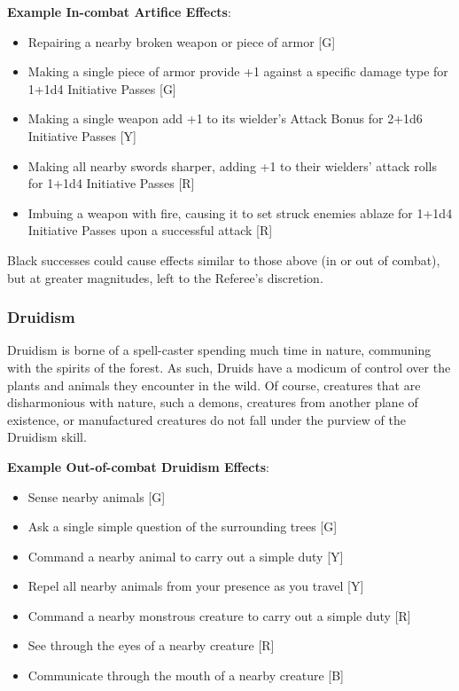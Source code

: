 \documentclass[oneside]{book}
\begin{document}
\begin{multicols}{2}
\textbf{Example In-combat Artifice Effects}: 
	\begin{itemize}
		\setlength{\itemsep}{0cm}%
  		\setlength{\parskip}{0cm}%
  		\item{ \small Repairing a nearby broken weapon or piece of armor [G]}
  		\item{ \small Making a single piece of armor provide +1 against a specific damage type for 1+1d4 Initiative Passes [G]}
  		\item{ \small Making a single weapon add +1 to its wielder's Attack Bonus for 2+1d6 Initiative Passes [Y]}
  		\item{ \small Making all nearby swords sharper, adding +1 to their wielders' attack rolls for 1+1d4 Initiative Passes [R]}
  		\item{ \small Imbuing a weapon with fire, causing it to set struck enemies ablaze for 1+1d4 Initiative Passes upon a successful attack [R]}
	\end{itemize}
Black successes could cause effects similar to those above (in or out of combat), but at greater magnitudes, left to the Referee's discretion.

\subsubsection{Druidism}
Druidism is borne of a spell-caster spending much time in nature, communing with the spirits of the forest. As such, Druids have a modicum of control over the plants and animals they encounter in the wild. Of course, creatures that are disharmonious with nature, such a demons, creatures from another plane of existence, or manufactured creatures do not fall under the purview of the Druidism skill.

\textbf{Example Out-of-combat Druidism Effects}: 
	\begin{itemize}
		\setlength{\itemsep}{0cm}%
  		\setlength{\parskip}{0cm}%
		\item{ \small Sense nearby animals [G]}
		\item{ \small Ask a single simple question of the surrounding trees [G]}
		\item{ \small Command a nearby animal to carry out a simple duty [Y]}
		\item{ \small Repel all nearby animals from your presence as you travel [Y]}
		\item{ \small Command a nearby monstrous creature to carry out a simple duty [R]}
		\item{ \small See through the eyes of a nearby creature [R]}
		\item{ \small Communicate through the mouth of a nearby creature [B]}
	\end{itemize}
	

\end{multicols}
\end{document}
